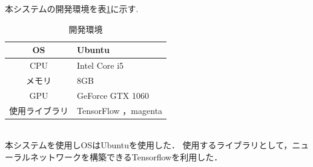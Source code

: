 \newpage
本システムの開発環境を表\ref{tab:開発環境}に示す.\\
    \begin{table}[h]
    \begin{center}
    \caption{開発環境}
    \label{tab:開発環境}
    \begin{tabular}{|c|p{}|}
    \hline
        OS & Ubuntu\\
        \hline
        CPU & Intel Core i5\\
        \hline
        メモリ & 8GB\\
        \hline
        GPU & GeForce GTX 1060\\
        \hline
        使用ライブラリ & TensorFlow ，magenta\\
        \hline
    \end{tabular}
    \end{center}
    \end{table}\\
本システムを使用しOSはUbuntuを使用した．
使用するライブラリとして，ニューラルネットワークを構築できるTensorflowを利用した．